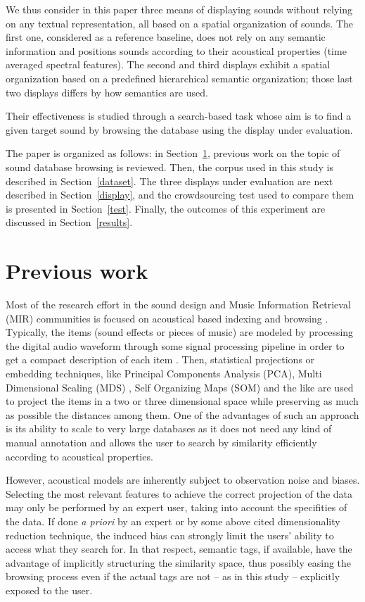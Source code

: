 \documentclass{aes2e}
\begin{document}
We thus consider in this paper three means of displaying sounds without relying on any textual representation, all based on a spatial organization of sounds. The first one, considered as a reference baseline, does not rely on any semantic information and positions sounds according to their acoustical properties (time averaged spectral features). The second and third displays exhibit a spatial organization based  on a predefined hierarchical semantic organization; those last two displays differs by how semantics are used.

Their effectiveness is studied through a search-based task whose aim is to find a given target sound by browsing the database using the display under evaluation.

The paper is organized as follows: in Section~\ref{previous}, previous work on the topic of sound database browsing is reviewed. Then, the corpus used in this study is described in Section~\ref{dataset}. The three displays under evaluation are next described in Section~\ref{display}, and the crowdsourcing test used to compare them is presented in Section~\ref{test}. Finally, the outcomes of this experiment are discussed in Section~\ref{results}.  

\section{Previous work} \label{previous}

Most of the research effort in the sound design and Music Information Retrieval (MIR) communities is focused on acoustical based indexing and browsing \cite{tzanetakis2003musescape, streich2008music}. Typically, the items (sound effects or pieces of music) are modeled by processing the digital audio waveform through some signal processing pipeline in order to get a compact description of each item
\cite{coleman2007mused}. Then, statistical projections or embedding techniques, like Principal Components Analysis (PCA),  Multi Dimensional Scaling (MDS) \cite{schwarz2009sound,Cano2002}, Self Organizing Maps (SOM) \cite{pampalk2004exploring} and the like are used to project the items in a two or three dimensional space while preserving as much as possible the distances among them. One of the advantages of such an approach is its ability to scale to very large databases \cite{schwarz2009scalability} as it does not need any kind of manual annotation and allows the user to search by similarity efficiently according to acoustical properties.

However, acoustical models are inherently subject to observation noise and biases. Selecting the most relevant features to achieve the correct projection of the data may only be performed by an expert user, taking into account the specifities of the data. If done \textit{a priori} by an expert or by some above cited dimensionality reduction technique, the induced bias can strongly limit the users' ability to access what they search for. In that respect, semantic tags, if available, have the advantage of implicitly structuring the similarity space, thus possibly easing the browsing process even if the actual tags are not -- as in this study -- explicitly exposed to the user.
\end{document}
